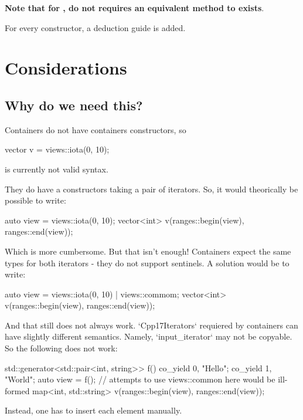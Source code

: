 \documentclass{wg21}
\begin{document}
\textbf{Note that for ,  do not requires an equivalent 
method to exists}.

For every constructor, a deduction guide is added.


\section{Considerations}


\subsection{Why do we need this?}

Containers do not have containers constructors, so

\begin{colorblock}
vector v = views::iota(0, 10);
\end{colorblock}

is currently not valid syntax.

They do have a constructors taking a pair of iterators.
So, it would theorically be possible to write:

\begin{colorblock}
auto view = views::iota(0, 10);
vector<int> v(ranges::begin(view), ranges::end(view));
\end{colorblock}

Which is more cumbersome. But that isn't enough! Containers expect the same types for both iterators - they do not support sentinels.
A solution would be to write:
\begin{colorblock}
auto view = views::iota(0, 10) | views::commom;
vector<int> v(ranges::begin(view), ranges::end(view));
\end{colorblock}

And that still does not always work. `Cpp17Iterators` requiered by containers can have slightly different semantics.
Namely, `input_iterator` may not be copyable. So the following does not work:

\begin{colorblock}
std::generator<std::pair<int, string>> f() {
   co_yield {0, "Hello"};
   co_yield {1, "World"};
}
auto view = f(); // attempts to use views::common here would be ill-formed
map<int, std::string> v(ranges::begin(view), ranges::end(view));
\end{colorblock}

Instead, one has to insert each element manually.
\end{document}
